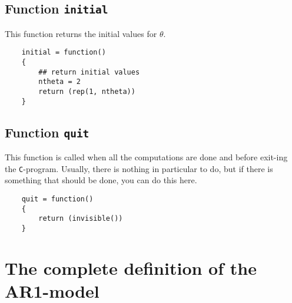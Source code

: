 \documentclass[a4paper,11pt]{article}
\begin{document}
\subsection*{Function \texttt{initial}}

This function returns the initial values for $\theta$.
{\small
\begin{verbatim}
    initial = function()
    {
        ## return initial values
        ntheta = 2
        return (rep(1, ntheta))
    }
\end{verbatim}
}

\subsection*{Function \texttt{quit}}

This function is called when all the computations are done and before
exit-ing the \texttt{C}-program. Usually, there is nothing in
particular to do, but if there is something that should be done, you
can do this here.
{\small
\begin{verbatim}
    quit = function()
    {
        return (invisible())
    }
\end{verbatim}
}


\section*{The complete definition of the AR1-model}
\end{document}
